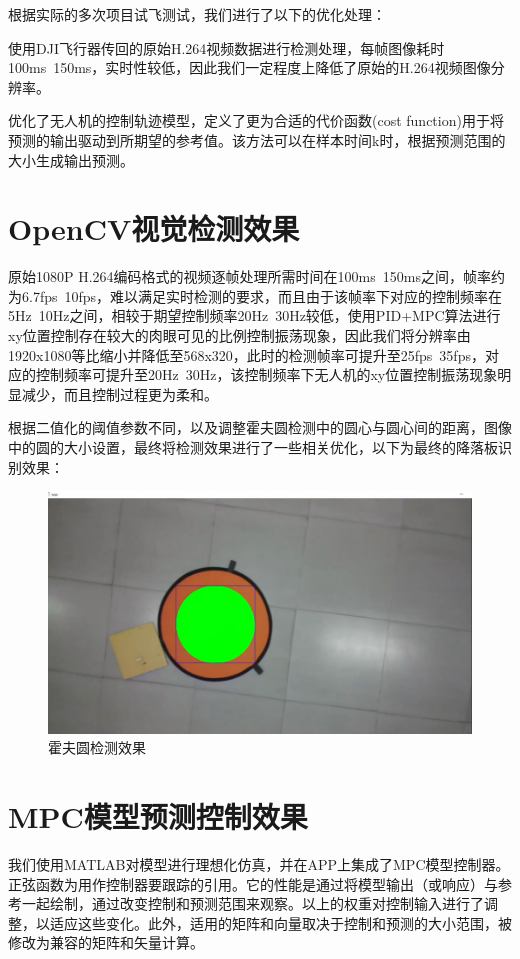 根据实际的多次项目试飞测试，我们进行了以下的优化处理：

使用DJI飞行器传回的原始H.264视频数据进行检测处理，每帧图像耗时100ms~150ms，实时性较低，因此我们一定程度上降低了原始的H.264视频图像分辨率。

优化了无人机的控制轨迹模型，定义了更为合适的代价函数(cost function)用于将预测的输出驱动到所期望的参考值。该方法可以在样本时间k时，根据预测范围的大小生成输出预测。

\section{OpenCV视觉检测效果}

原始1080P H.264编码格式的视频逐帧处理所需时间在100ms~150ms之间，帧率约为6.7fps~10fps，难以满足实时检测的要求，而且由于该帧率下对应的控制频率在5Hz~10Hz之间，相较于期望控制频率20Hz~30Hz较低，使用PID+MPC算法进行xy位置控制存在较大的肉眼可见的比例控制振荡现象，因此我们将分辨率由1920x1080等比缩小并降低至568x320，此时的检测帧率可提升至25fps~35fps，对应的控制频率可提升至20Hz~30Hz，该控制频率下无人机的xy位置控制振荡现象明显减少，而且控制过程更为柔和。

根据二值化的阈值参数不同，以及调整霍夫圆检测中的圆心与圆心间的距离，图像中的圆的大小设置，最终将检测效果进行了一些相关优化，以下为最终的降落板识别效果：

\begin{figure}[ht]
  \centering
  \includegraphics[width=0.8\linewidth]{./Figure/Hough_Circle_Detection.png}
  \caption{霍夫圆检测效果}\label{Fig:xd1}
\end{figure}

\section{MPC模型预测控制效果}

我们使用MATLAB对模型进行理想化仿真，并在APP上集成了MPC模型控制器。正弦函数为用作控制器要跟踪的引用。它的性能是通过将模型输出（或响应）与参考一起绘制，通过改变控制和预测范围来观察。以上的权重对控制输入进行了调整，以适应这些变化。此外，适用的矩阵和向量取决于控制和预测的大小范围，被修改为兼容的矩阵和矢量计算。

